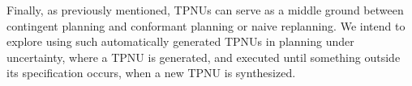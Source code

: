Finally, as previously mentioned, TPNUs can serve as a middle ground between contingent planning and conformant planning or naive replanning. We intend to explore using such automatically generated TPNUs in planning under uncertainty, where a TPNU is generated, and executed until something outside its specification occurs, when a new TPNU is synthesized.



